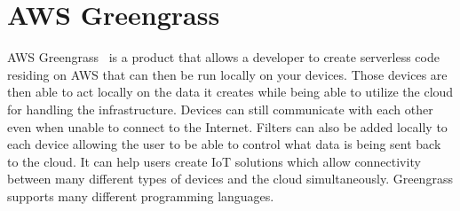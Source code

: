 \section{AWS Greengrass}
AWS Greengrass~\cite{hid-sp18-521-Greengrass} is a product that allows a
developer to create serverless code residing on AWS that can then be run
locally on your devices. Those devices are then able to act locally on the data
it creates while being able to utilize the cloud for handling the infrastructure. 
Devices can still communicate with each other even when unable to connect to the
Internet. Filters can also be added locally to each device allowing the user to be 
able to control what data is being sent back to the cloud. It can help users create
IoT solutions which allow connectivity between many different types of devices
and the cloud simultaneously. Greengrass supports many different programming languages.

